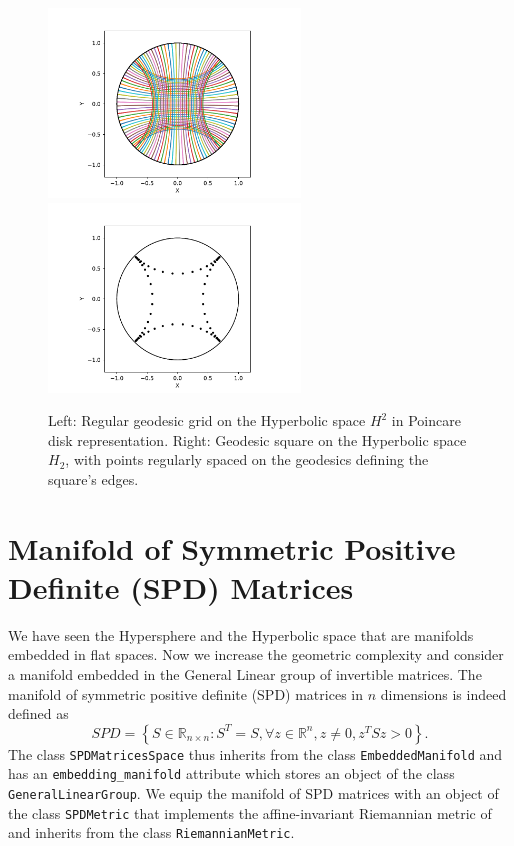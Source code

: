 \documentclass{article}
\begin{document}
\begin{figure}[h!]
    \centering
    \includegraphics[width=190pt]{grid_h2.pdf}
    \includegraphics[width=190pt]{square_h2.pdf}
    \caption{Left: Regular geodesic grid on the Hyperbolic space $H^2$ in Poincare disk representation. Right: Geodesic square on the Hyperbolic space $H_2$, with points regularly spaced on the geodesics defining the square's edges.}
    \label{fig:poincaredisk}
\end{figure}

\section{Manifold of Symmetric Positive Definite (SPD) Matrices}\label{sec:spdspace}

We have seen the Hypersphere and the Hyperbolic space that are manifolds embedded in flat spaces. Now we increase the geometric complexity and consider a manifold embedded in the General Linear group of invertible matrices. The manifold of symmetric positive definite (SPD) matrices in $n$ dimensions is indeed defined as
\begin{equation}
SPD = \left\{
S \in \mathbb{R}_{n \times n}: S^T = S, \forall z \in \mathbb{R}^n, z \neq 0, z^TSz > 0
\right\}.
\end{equation}
The class \texttt{SPDMatricesSpace} thus inherits from the class \texttt{EmbeddedManifold} and has an \texttt{embedding\_manifold} attribute which stores an object of the class \texttt{GeneralLinearGroup}. We equip the manifold of SPD matrices with an object of the class \texttt{SPDMetric} that implements the affine-invariant Riemannian metric of \cite{Pennec2006b} and inherits from the class \texttt{RiemannianMetric}.
\end{document}
